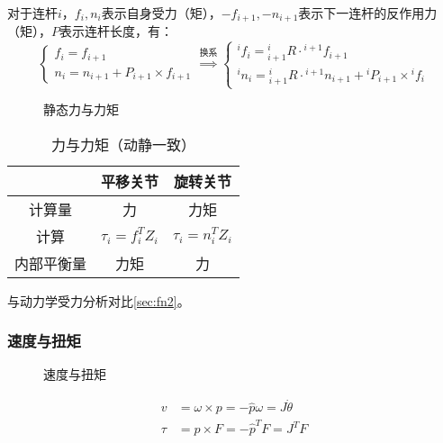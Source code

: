 \documentclass[
12pt, %
a4paper, 
oneside, %
headinclude,footinclude, %
]{scrartcl}
\begin{document}
对于连杆$ i $，$ f_i, n_i $表示自身受力（矩），$ -f_{i + 1}, -n_{i + 1} $表示下一连杆的反作用力（矩），$ P $表示连杆长度，有：
$$
\begin{cases}
f_i = f_{i + 1} \\
n_i = n_{i + 1} + P_{i + 1} \times f_{i + 1}
\end{cases}
\overset{\text{换系}}{\Longrightarrow}
\begin{cases}
{}^i f_i = {}^i_{i + 1}R \cdot {}^{i + 1} f_{i + 1} \\
{}^i n_i = {}^i_{i + 1}R \cdot {}^{i + 1} n_{i + 1} + {}^i P_{i + 1} \times {}^i f_i
\end{cases}
$$
\noindent
\begin{minipage}{0.65\textwidth}
\begin{figure}[H]
\centering
{} \quad
{} \quad
{}
\caption{静态力与力矩}
\end{figure}
\end{minipage}
\begin{minipage}{0.35\textwidth}
\begin{table}[H]
\centering
\begin{tabular}{c|cc}
\hline
& 平移关节 & 旋转关节 \\
\hline
计算量 & 力 & 力矩 \\
计算 & $ \tau_i = f_i^T Z_i $ & $ \tau_i = n_i^T Z_i $ \\
内部平衡量 & 力矩 & 力 \\
\hline
\end{tabular}
\caption{力与力矩（动静一致）}
\end{table}
\end{minipage}

与动力学受力分析对比\ref{sec:fn2}。
\subsubsection[速度与扭矩]{速度与扭矩}
\noindent
\begin{minipage}{0.6\textwidth}
\begin{figure}[H]
\centering
\subfloat[角速度与线速度]{\texttt{[image: wv]}} \quad
\subfloat[力与扭矩]{\texttt{[image: ft]}}
\caption{速度与扭矩}
\end{figure}
\end{minipage}
\begin{minipage}{0.4\textwidth}
\begin{align*}
v &= \omega \times p = -\hat{p} \omega = J \dot{\theta} \\
\tau &= p \times F = -\hat{p}^T F = J^T F
\end{align*}
\end{minipage}
\end{document}
